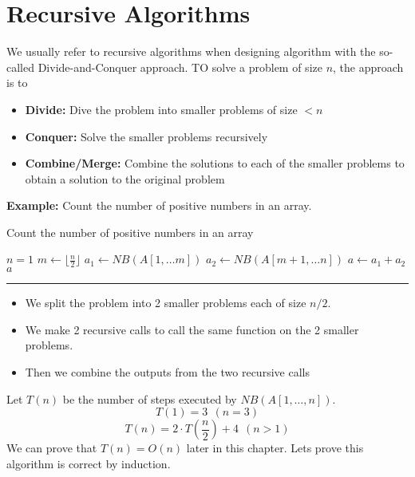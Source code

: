 \documentclass[openany]{report}
\begin{document}
\section{Recursive Algorithms}
We usually refer to recursive algorithms when designing algorithm with the so-called Divide-and-Conquer approach. TO solve a problem of size $n$, the approach is to 
\begin{itemize}
    \item \textbf{Divide:} Dive the problem into smaller problems of size $< n$
    \item \textbf{Conquer:} Solve the smaller problems recursively
    \item \textbf{Combine/Merge:} Combine the solutions to each of the smaller problems to obtain a solution to the original problem
\end{itemize}
\noindent
\textbf{Example:} Count the number of positive numbers in an array.
\begin{algorithm}
    \caption{Count the number of positive numbers in an array}
    \begin{algorithmic}
        \If $n = 1$
        \Else
        \EndIf
        \Else      
        \State $m \gets \lfloor \frac{n}{2} \rfloor$
        \State $a_1 \gets NB(A[1, \ldots m])$
        \State $a_2 \gets NB(A[m+1, \ldots n])$
        \State $a \gets a_1 + a_2$
        \State \Return $a$
        \EndIf
        \EndProcedure
    \end{algorithmic}
    \hrule
\end{algorithm}
\begin{itemize}
    \item We split the problem into 2 smaller problems each of size $n/2$.
    \item We make 2 recursive calls to call the same function on the 2 smaller problems.
    \item Then we combine the outputs from the two recursive calls
\end{itemize}
Let $T(n)$ be the number of steps executed by $NB(A[1,\ldots,n])$. 
\[T(1) = 3 \ \ (n = 3)\]
\[T(n) = 2 \cdot T\left(\frac{n}{2}\right) + 4 \ \ (n>1)\]
We can prove that $T(n) = O(n)$ later in this chapter. Lets prove this algorithm is correct by induction. 
\end{document}
